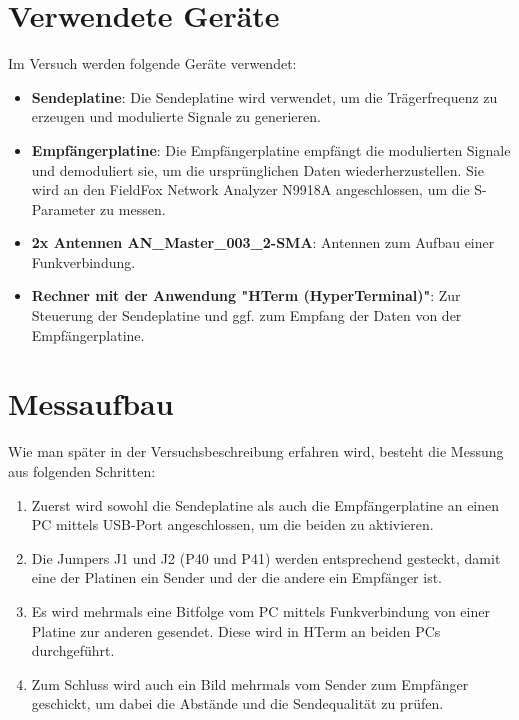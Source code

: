\section{Verwendete Geräte}
Im Versuch werden folgende Geräte verwendet:
\begin{itemize}
    \item \textbf{Sendeplatine}: Die Sendeplatine wird verwendet, um die Trägerfrequenz zu erzeugen und modulierte Signale zu generieren.
    \item \textbf{Empfängerplatine}: Die Empfängerplatine empfängt die modulierten Signale und demoduliert sie, um die ursprünglichen Daten wiederherzustellen. Sie wird an den FieldFox Network Analyzer N9918A angeschlossen, um die S-Parameter zu messen.
    \item \textbf{2x Antennen AN\_Master\_003\_2-SMA}: Antennen zum Aufbau einer Funkverbindung.
    \item \textbf{Rechner mit der Anwendung "HTerm (HyperTerminal)"}: Zur Steuerung der Sendeplatine und ggf. zum Empfang der Daten von der Empfängerplatine.
\end{itemize}
\section{Messaufbau}
Wie man später in der Versuchsbeschreibung erfahren wird, besteht die Messung aus folgenden Schritten:
\begin{enumerate}
    \item Zuerst wird sowohl die Sendeplatine als auch die Empfängerplatine an einen PC mittels USB-Port angeschlossen, um die beiden zu aktivieren.
    \item Die Jumpers J1 und J2 (P40 und P41) werden entsprechend gesteckt, damit eine der Platinen ein Sender und der die andere ein Empfänger ist.
    \item Es wird mehrmals eine Bitfolge vom PC mittels Funkverbindung von einer Platine zur anderen gesendet. Diese wird in HTerm an beiden PCs durchgeführt.
    \item Zum Schluss wird auch ein Bild mehrmals vom Sender zum Empfänger geschickt, um dabei die Abstände und die Sendequalität zu prüfen.
\end{enumerate}
\clearpage